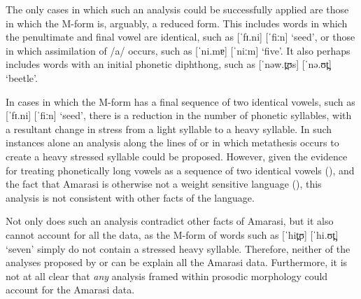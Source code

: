 The only cases in which such an analysis could be successfully
applied are those in which the M-form is, arguably, a reduced form.
This includes words in which the penultimate and final vowel
are identical, such as  [ˈfɪ.ni] {\ra}  [ˈfiːn] `seed',
or those in which assimilation of /a/ occurs, such as  [ˈni.mɐ] {\ra}  [ˈniːm] `five'.
It also perhaps includes words with an initial phonetic diphthong,
such as  [ˈnəw.t̪ʊs] {\ra}  [ˈnə.ʊt̪] `beetle'.

In cases in which the M-form
has a final sequence of two identical vowels,
such as  [ˈfɪ.ni] {\ra}  [ˈfiːn] `seed',
there is a reduction in the number of phonetic syllables,
with a resultant change in stress from a light syllable to a heavy syllable.
In such instances alone an analysis along the lines of \cite{mcc00} or \cite{he04}
in which metathesis occurs to create a heavy stressed syllable could be proposed.
However, given the evidence for treating phonetically long vowels
as a sequence of two identical vowels (),
and the fact that Amarasi is otherwise not a weight sensitive language (),
this analysis is not consistent with other facts of the language.

Not only does such an analysis contradict other
facts of Amarasi, but it also cannot account for all the data,
as the M-form of words such as  [ˈhit̪ʊ] {\ra}  [ˈhi.ʊt̪] `seven'
simply do not contain a stressed heavy syllable.
Therefore, neither of the analyses proposed by \citet{mcc00} or \citet{he04}
can be explain all the Amarasi data.
Furthermore, it is not at all clear that \emph{any} analysis
framed within prosodic morphology could account for the Amarasi data.

